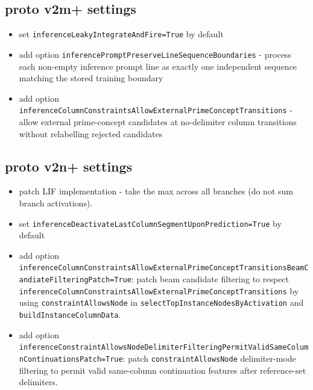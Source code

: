 \subsection{proto v2m+ settings}
\begin{itemize}
    \item set \texttt{inferenceLeakyIntegrateAndFire=True} by default
    \item add option \texttt{inferencePromptPreserveLineSequenceBoundaries} - process each non-empty inference prompt line as exactly one independent sequence matching the stored training boundary
    \item add option \texttt{inferenceColumnConstraintsAllowExternalPrimeConceptTransitions} - allow external prime-concept candidates at no-delimiter column transitions without relabelling rejected candidates
\end{itemize}

\subsection{proto v2n+ settings}
\begin{itemize}
	\item  patch LIF implementation - take the max across all branches (do not sum branch activations).
	\item  set \texttt{inferenceDeactivateLastColumnSegmentUponPrediction=True} by default
	\item  add option \texttt{inferenceColumnConstraintsAllowExternalPrimeConceptTransitionsBeamCandiateFilteringPatch=True}: patch beam candidate filtering to respect \texttt{inferenceColumnConstraintsAllowExternalPrimeConceptTransitions} by using \texttt{constraintAllowsNode} in \texttt{selectTopInstanceNodesByActivation} and \texttt{buildInstanceColumnData}.
	\item  add option \texttt{inferenceConstraintAllowsNodeDelimiterFilteringPermitValidSameColumnContinuationsPatch=True}: patch \texttt{constraintAllowsNode} delimiter-mode filtering to permit valid same-column continuation features after reference-set delimiters.
\end{itemize}

